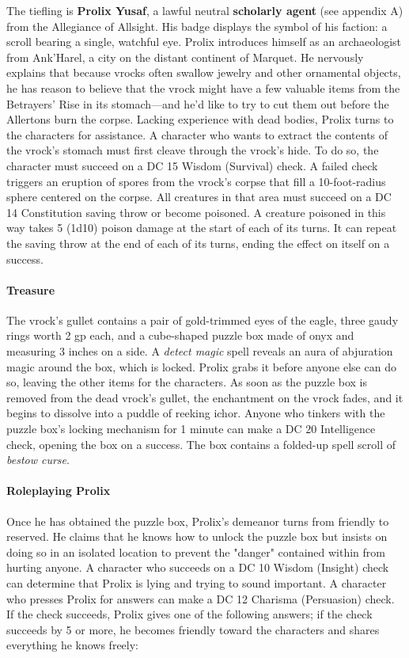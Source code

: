 \documentclass[10pt,a4,twoside,twocolumn,openany,nodeprecatedcode]{dndbook}
\begin{document}
The tiefling is \textbf{Prolix Yusaf}, a lawful neutral \textbf{scholarly agent} (see appendix A) from the Allegiance of Allsight. His badge displays the symbol of his faction: a scroll bearing a single, watchful eye.
Prolix introduces himself as an archaeologist from Ank'Harel, a city on the distant continent of Marquet. He nervously explains that because vrocks often swallow jewelry and other ornamental objects, he has reason to believe that the vrock might have a few valuable items from the Betrayers' Rise in its stomach—and he'd like to try to cut them out before the Allertons burn the corpse.
Lacking experience with dead bodies, Prolix turns to the characters for assistance. A character who wants to extract the contents of the vrock's stomach must first cleave through the vrock's hide. To do so, the character must succeed on a DC 15 Wisdom (Survival) check. A failed check triggers an eruption of spores from the vrock's corpse that fill a 10-foot-radius sphere centered on the corpse. All creatures in that area must succeed on a DC 14 Constitution saving throw or become poisoned. A creature poisoned in this way takes 5 (1d10) poison damage at the start of each of its turns. It can repeat the saving throw at the end of each of its turns, ending the effect on itself on a success.
\paragraph{Treasure}
The vrock's gullet contains a pair of gold-trimmed eyes of the eagle, three gaudy rings worth 2 gp each, and a cube-shaped puzzle box made of onyx and measuring 3 inches on a side. A \textit{detect magic} spell reveals an aura of abjuration magic around the box, which is locked. Prolix grabs it before anyone else can do so, leaving the other items for the characters. As soon as the puzzle box is removed from the dead vrock's gullet, the enchantment on the vrock fades, and it begins to dissolve into a puddle of reeking ichor.
Anyone who tinkers with the puzzle box's locking mechanism for 1 minute can make a DC 20 Intelligence check, opening the box on a success. The box contains a folded-up spell scroll of \textit{bestow curse}.
\paragraph{Roleplaying Prolix}
Once he has obtained the puzzle box, Prolix's demeanor turns from friendly to reserved. He claims that he knows how to unlock the puzzle box but insists on doing so in an isolated location to prevent the "danger" contained within from hurting anyone. A character who succeeds on a DC 10 Wisdom (Insight) check can determine that Prolix is lying and trying to sound important.
A character who presses Prolix for answers can make a DC 12 Charisma (Persuasion) check. If the check succeeds, Prolix gives one of the following answers; if the check succeeds by 5 or more, he becomes friendly toward the characters and shares everything he knows freely:
\end{document}
